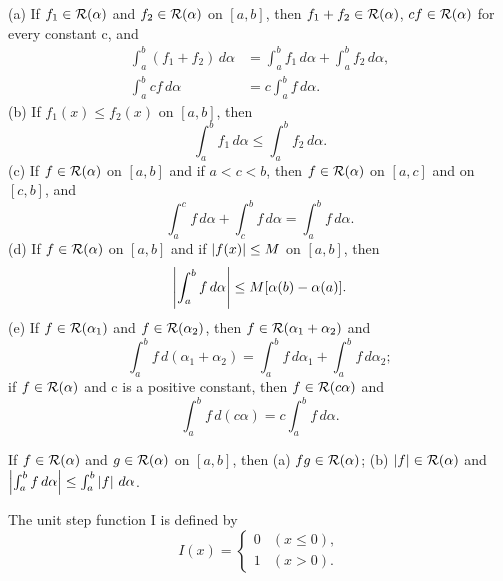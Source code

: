 \begin{theorem} %
  \label{thm:chap6:integral_properties}
  (a) If $f_1 \in \mathcal{R}(\alpha)$ and $f_2 \in
  \mathcal{R}(\alpha)$ on $[a, b]$, then $f_1+f_2 \in
  \mathcal{R}(\alpha)$, $c f \in \mathcal{R}(\alpha)$ for every
  constant c, and
  \begin{align*}
    \int_a^b (f_1 + f_2) \, d\alpha &= \int_a^b f_1 \, d\alpha +
    \int_a^b f_2 \, d\alpha, \\
    \int_a^b c f \, d\alpha &= c \int_a^b f \, d\alpha.
  \end{align*}
  (b) If $f_1(x) \le f_2(x)$ on $[a, b]$, then
  \[ \int_a^b f_1 \, d\alpha \le \int_a^b f_2 \, d\alpha. \]
  (c) If $f \in \mathcal{R}(\alpha)$ on $[a, b]$ and if $a < c <
  b$, then $f \in \mathcal{R}(\alpha)$ on $[a, c]$ and on $[c, b]$, and
  \[ \int_a^c f \, d\alpha + \int_c^b f \, d\alpha = \int_a^b f \, d\alpha. \]
  (d) If $f \in \mathcal{R}(\alpha)$ on $[a, b]$ and if $\left\lvert f(x) \right\rvert
  \le M$ on $[a, b]$, then
  \[ \left\lvert \int_a^b f \, d\alpha \right\rvert \le M[\alpha(b) - \alpha(a)]. \]
  (e) If $f \in \mathcal{R}(\alpha_1)$ and $f \in
  \mathcal{R}(\alpha_2)$, then $f \in \mathcal{R}(\alpha_1 + \alpha_2)$ and
  \[ \int_a^b f \, d(\alpha_1 + \alpha_2) = \int_a^b f \, d\alpha_1 +
  \int_a^b f \, d\alpha_2; \]
  if $f \in \mathcal{R}(\alpha)$ and c is a positive constant, then
  $f \in \mathcal{R}(c\alpha)$ and
  \[ \int_a^b f \, d(c\alpha) = c \int_a^b f \, d\alpha. \]
\end{theorem}

\begin{theorem} %
  \label{thm:chap6:product_abs_integrability}
  If $f \in \mathcal{R}(\alpha)$ and $g \in \mathcal{R}(\alpha)$
  on $[a, b]$, then
  (a) $fg \in \mathcal{R}(\alpha)$;
  (b) $\left\lvert f \right\rvert \in \mathcal{R}(\alpha)$ and $\left\lvert \int_a^b f \,
  d\alpha \right\rvert \le \int_a^b \left\lvert f \right\rvert \, d\alpha$.
\end{theorem}

\begin{definition} %
  \label{def:chap6:unit_step_function}
  The unit step function I is defined by
  \[ I(x) =
    \begin{cases} 0 & (x \le 0), \\ 1 & (x > 0).
  \end{cases} \]
\end{definition}

